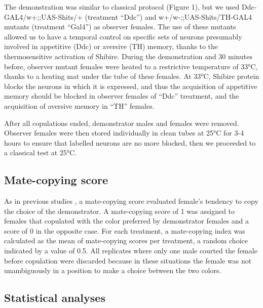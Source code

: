 \documentclass[a4paper, 12pt]{article}
\begin{document}
	The demonstration was similar to classical protocol (Figure 1), but we used Ddc-GAL4/w+;;UAS-Shits/+ (treatment “Ddc”) and w+/w-;;UAS-Shits/TH-GAL4 mutants (treatment “Gal4”) as observer females. The use of these mutants allowed us to have a temporal control on specific sets of neurons presumably involved in appetitive (Ddc) or aversive (TH) memory, thanks to the thermosensitive activation of Shibire. During the demonstration and 30 minutes before, observer mutant females were heated to a restrictive temperature of 33°C, thanks to a heating mat under the tube of these females. At 33°C, Shibire protein blocks the neurons in which it is expressed, and thus the acquisition of appetitive memory should be blocked in observer females of “Ddc” treatment, and the acquisition of aversive memory in “TH” females. 
	
	After all copulations ended, demonstrator males and females were removed. Observer females were then stored individually in clean tubes at 25°C for 3-4 hours to ensure that labelled neurons are no more blocked, then we proceeded to a classical test at 25°C.


	\subsection{Mate-copying score}

	As in previous studies \parencite{danchin_cultural_2018,nobel_mate-copying_2018,monier_dopamine_2018}, a mate-copying score evaluated female’s tendency to copy the choice of the demonstrator. A mate-copying score of 1 was assigned to females that copulated with the color preferred by demonstrator females and a score of 0 in the opposite case. For each treatment, a mate-copying index was calculated as the mean of mate-copying scores per treatment, a random choice indicated by a value of 0.5. All replicates where only one male courted the female before copulation were discarded because in these situations the female was not unambiguously in a position to make a choice between the two colors.

	\subsection{Statistical analyses}
\end{document}
